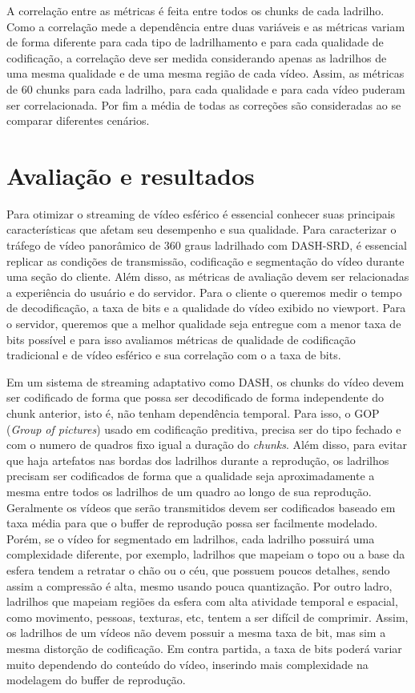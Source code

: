 {A correlação entre as métricas é feita entre todos os chunks de cada ladrilho. Como a correlação mede a dependência entre duas variáveis e as métricas variam de forma diferente para cada tipo de ladrilhamento e para cada qualidade de codificação, a correlação deve ser medida considerando apenas as ladrilhos de uma mesma qualidade e de uma mesma região de cada vídeo. Assim, as métricas de 60 chunks para cada ladrilho, para cada qualidade e para cada vídeo puderam ser correlacionada. Por fim a média de todas as correções são consideradas ao se comparar diferentes cenários.


\chapter{Avaliação e resultados}\label{Cap:Evaluation}

Para otimizar o streaming de vídeo esférico é essencial conhecer suas principais características que afetam seu desempenho e sua qualidade. Para caracterizar o tráfego de vídeo panorâmico de 360 graus ladrilhado com DASH-SRD, é essencial replicar as condições de transmissão, codificação e segmentação do vídeo durante uma seção do cliente. Além disso, as métricas de avaliação devem ser relacionadas a experiência do usuário e do servidor. Para o cliente o queremos medir o tempo de decodificação, a taxa de bits e a qualidade do vídeo exibido no viewport. Para o servidor, queremos que a melhor qualidade seja entregue com a menor taxa de bits possível e para isso avaliamos métricas de qualidade de codificação tradicional e de vídeo esférico e sua correlação com o a taxa de bits.

Em um sistema de streaming adaptativo como DASH, os chunks do vídeo devem ser codificado de forma que possa ser decodificado de forma independente do chunk anterior, isto é, não tenham dependência temporal. Para isso, o GOP (\textit{Group of pictures}) usado em codificação preditiva, precisa ser do tipo fechado e com o numero de quadros fixo igual a duração do \textit{chunks}. Além disso, para evitar que haja artefatos nas bordas dos ladrilhos durante a reprodução, os ladrilhos precisam ser codificados de forma que a qualidade seja aproximadamente a mesma entre todos os ladrilhos de um quadro ao longo de sua reprodução. Geralmente os vídeos que serão transmitidos devem ser codificados baseado em taxa média para que o buffer de reprodução possa ser facilmente modelado. Porém, se o vídeo for segmentado em ladrilhos, cada ladrilho possuirá uma complexidade diferente, por exemplo, ladrilhos que mapeiam o topo ou a base da esfera tendem a retratar o chão ou o céu, que possuem poucos detalhes, sendo assim a compressão é alta, mesmo usando pouca quantização. Por outro ladro, ladrilhos que mapeiam regiões da esfera com alta atividade temporal e espacial, como movimento, pessoas, texturas, etc, tentem a ser difícil de comprimir. Assim, os ladrilhos de um vídeos não devem possuir a mesma taxa de bit, mas sim a mesma distorção de codificação. Em contra partida, a taxa de bits poderá variar muito dependendo do conteúdo do vídeo, inserindo mais complexidade na modelagem do buffer de reprodução.


}
